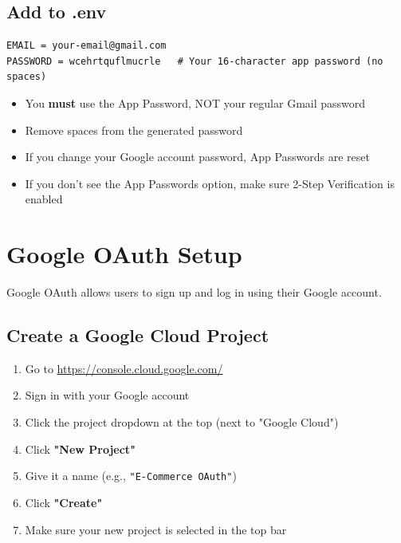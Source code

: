\documentclass[12pt,a4paper]{article}
\begin{document}
\subsection{Add to .env}

\begin{lstlisting}[caption=Email configuration in config/.env]
EMAIL = your-email@gmail.com
PASSWORD = wcehrtquflmucrle   # Your 16-character app password (no spaces)
\end{lstlisting}

\begin{tcolorbox}[colback=red!5!white,colframe=red!75!black,title= Important Notes]
    \begin{itemize}
        \item You \textbf{must} use the App Password, NOT your regular Gmail password
        \item Remove spaces from the generated password
        \item If you change your Google account password, App Passwords are reset
        \item If you don't see the App Passwords option, make sure 2-Step Verification is enabled
    \end{itemize}
\end{tcolorbox}

\newpage

\section{Google OAuth Setup}

Google OAuth allows users to sign up and log in using their Google account.

\subsection{Create a Google Cloud Project}

\begin{enumerate}[leftmargin=*,itemsep=0.5em]
    \item Go to \url{https://console.cloud.google.com/}
    \item Sign in with your Google account
    \item Click the project dropdown at the top (next to "Google Cloud")
    \item Click \textbf{"New Project"}
    \item Give it a name (e.g., \texttt{"E-Commerce OAuth"})
    \item Click \textbf{"Create"}
    \item Make sure your new project is selected in the top bar
\end{enumerate}
\end{document}

